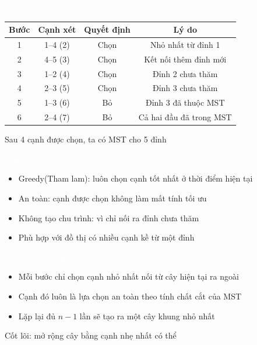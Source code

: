 \documentclass{beamer}
\newcommand{\hlblue}[1]{\textcolor{myblue}{#1}}
\newcommand{\hlgreen}[1]{\textcolor{mygreen}{#1}}
\newcommand{\hlred}[1]{\textcolor{myred}{#1}}
\newcommand{\hlpurple}[1]{\textcolor{mypurple}{#1}}
\newcommand{\hlwhite}[1]{\textcolor{white}{#1}}
\begin{document}

\begin{frame}{\hlwhite{Ví dụ từng bước}}
\begin{table}[]
\centering
\begin{tabular}{|c|c|c|c|}
\hline
\rowcolor{blue!10}
\textbf{Bước} & \textbf{Cạnh xét} & \textbf{Quyết định} & \textbf{Lý do} \\
\hline
1 & 1--4 (2) & Chọn & Nhỏ nhất từ đỉnh 1 \\
\hline
2 & 4--5 (3) & Chọn & Kết nối thêm đỉnh mới \\
\hline
3 & 1--2 (4) & Chọn & Đỉnh 2 chưa thăm \\
\hline
4 & 2--3 (5) & Chọn & Đỉnh 3 chưa thăm \\
\hline
5 & 1--3 (6) & Bỏ & Đỉnh 3 đã thuộc MST \\
\hline
6 & 2--4 (7) & Bỏ & Cả hai đầu đã trong MST \\
\hline
\end{tabular}
\end{table}

\begin{tcolorbox}
\centering
\hlpurple{Sau 4 cạnh được chọn, ta có MST cho 5 đỉnh}
\end{tcolorbox}
\end{frame}


\begin{frame}{\hlwhite{Tính chất quan trọng}}
\begin{itemize}
\item \hlblue{Greedy(Tham lam)}: luôn chọn cạnh tốt nhất ở thời điểm hiện tại
\item \hlgreen{An toàn}: cạnh được chọn không làm mất tính tối ưu
\item \hlred{Không tạo chu trình}: vì chỉ nối ra đỉnh chưa thăm
\item Phù hợp với đồ thị có nhiều cạnh kề từ một đỉnh
\end{itemize}
\end{frame}


\begin{frame}{\hlwhite{Vì sao Prim đúng?}}
\begin{itemize}
\item Mỗi bước chỉ chọn cạnh nhỏ nhất nối từ cây hiện tại ra ngoài
\item Cạnh đó luôn là lựa chọn an toàn theo tính chất cắt của MST
\item Lặp lại đủ $n-1$ lần sẽ tạo ra một cây khung nhỏ nhất
\end{itemize}

\begin{tcolorbox}
\centering
\hlred{Cốt lõi: mở rộng cây bằng cạnh nhẹ nhất có thể}
\end{tcolorbox}
\end{frame}
\end{document}
